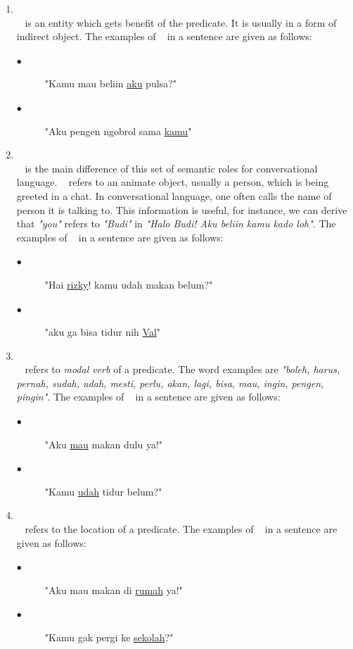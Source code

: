 \begin{enumerate}
	\item \beneficiary\\
	\beneficiary~ is an entity which gets benefit of the predicate. It is usually in a form of indirect object. The examples of \beneficiary~ in a sentence are given as follows:
	\begin{description}
		\item[$\bullet$] "Kamu mau beliin \underline{aku} pulsa?"
		\item[$\bullet$] "Aku pengen ngobrol sama \underline{kamu}"
	\end{description}
	
	\item \greet\\
	\greet~ is the main difference of this set of semantic roles for conversational language. \greet~ refers to an animate object, usually a person, which is being greeted in a chat. In conversational language, one often calls the name of person it is talking to. This information is useful, for instance, we can derive that \textit{"you"} refers to \textit{"Budi"} in \textit{"Halo Budi! Aku beliin kamu kado loh"}. The examples of \greet~ in a sentence are given as follows:
	\begin{description}
		\item[$\bullet$] "Hai \underline{rizky}! kamu udah makan belum?"
		\item[$\bullet$] "aku ga bisa tidur nih \underline{Val}"
	\end{description}

	\item \modal\\
	\modal~ refers to \textit{modal verb} of a predicate. The word examples are \textit{"boleh, harus, pernah, sudah, udah, mesti, perlu, akan, lagi, bisa, mau, ingin, pengen, pingin"}. The examples of \modal~ in a sentence are given as follows:
	\begin{description}
		\item[$\bullet$] "Aku \underline{mau} makan dulu ya!"
		\item[$\bullet$] "Kamu \underline{udah} tidur belum?"
	\end{description}

	\item \location\\
	\location~ refers to the location of a predicate. The examples of \location~ in a sentence are given as follows:
	\begin{description}
		\item[$\bullet$] "Aku mau makan di \underline{rumah} ya!"
		\item[$\bullet$] "Kamu gak pergi ke \underline{sekolah}?"
	\end{description}


\end{enumerate}
